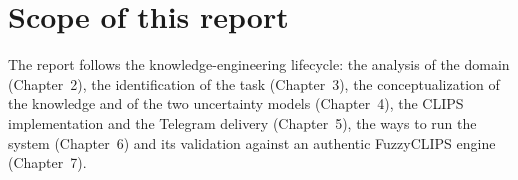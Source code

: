 \section{Scope of this report}

The report follows the knowledge-engineering lifecycle: the analysis of the
domain (Chapter~2), the identification of the task (Chapter~3), the
conceptualization of the knowledge and of the two uncertainty models
(Chapter~4), the CLIPS implementation and the Telegram delivery (Chapter~5), the
ways to run the system (Chapter~6) and its validation against an authentic
FuzzyCLIPS engine (Chapter~7).
